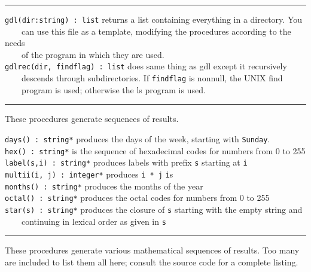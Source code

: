 \vspace{0.25cm}\hrule{}

\texttt{gdl(dir:string) : list} returns a list containing everything in
a directory. You\\
 \ \ \ \ can use this file as a template, modifying the procedures
according to the needs\\
 \ \ \ \ of the program in which they are used.\\
\texttt{gdlrec(dir, findflag) : list} does same thing as gdl except it
recursively\\
 \ \ \ \ descends through subdirectories. If \texttt{findflag} is
nonnull, the UNIX {\textquotedbl}find{\textquotedbl}\\
 \ \ \ \ program is used; otherwise the {\textquotedbl}ls{\textquotedbl} program
is used.

\vspace{0.25cm}\hrule{}

These procedures generate sequences of results. 

\texttt{days() : string*} produces the days of
the week, starting with
\texttt{{\textquotedbl}Sunday{\textquotedbl}}.\\
\texttt{hex() : string*} is the sequence of
hexadecimal codes for numbers from 0 to 255\\
\texttt{label(s,i) : string*} produces labels with prefix \texttt{s}
starting at \texttt{i}\\
\texttt{multii(i, j) : integer*} produces \texttt{i * j}
\texttt{i}{\textquotesingle}s\\
\texttt{months() : string*} produces the months of the year\\
\texttt{octal() : string*} produces the octal codes for
numbers from 0 to 255\\
\texttt{star(s) : string*} produces the closure of \texttt{s} starting with the
empty string and\\
 \ \ \ \ continuing in lexical order as given in \texttt{s} 

\vspace{0.25cm}\hrule{}

These procedures generate various mathematical
sequences of results. Too many are included to list
them all here; consult the source code for a complete listing.

